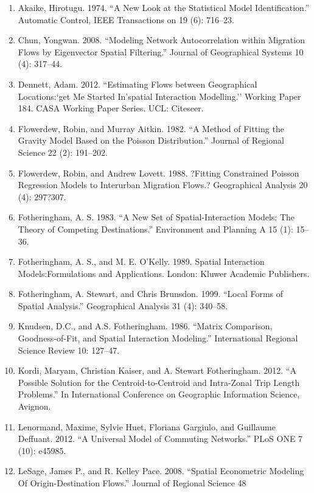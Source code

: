 \documentclass[11pt]{article}
\begin{document}
    \begin{enumerate}
\def\labelenumi{\arabic{enumi}.}
\item
  Akaike, Hirotugu. 1974. ``A New Look at the Statistical Model
  Identification.'' Automatic Control, IEEE Transactions on 19 (6):
  716--23.
\item
  Chun, Yongwan. 2008. ``Modeling Network Autocorrelation within
  Migration Flows by Eigenvector Spatial Filtering.'' Journal of
  Geographical Systems 10 (4): 317--44.
\item
  Dennett, Adam. 2012. ``Estimating Flows between Geographical
  Locations:`get Me Started In'spatial Interaction Modelling.'' Working
  Paper 184. CASA Working Paper Series. UCL: Citeseer.
\item
  Flowerdew, Robin, and Murray Aitkin. 1982. ``A Method of Fitting the
  Gravity Model Based on the Poisson Distribution.'' Journal of Regional
  Science 22 (2): 191--202.
\item
Flowerdew, Robin, and Andrew Lovett. 1988. ?Fitting Constrained Poisson Regression Models to Interurban Migration Flows.? Geographical Analysis 20 (4): 297?307. 
\item
  Fotheringham, A. S. 1983. ``A New Set of Spatial-Interaction Models:
  The Theory of Competing Destinations.'' Environment and Planning A 15
  (1): 15--36.
\item
  Fotheringham, A. S., and M. E. O'Kelly. 1989. Spatial Interaction
  Models:Formulations and Applications. London: Kluwer Academic
  Publishers.
\item
  Fotheringham, A. Stewart, and Chris Brunsdon. 1999. ``Local Forms of
  Spatial Analysis.'' Geographical Analysis 31 (4): 340--58.
\item
  Knudsen, D.C., and A.S. Fotheringham. 1986. ``Matrix Comparison,
  Goodness-of-Fit, and Spatial Interaction Modeling.'' International
  Regional Science Review 10: 127--47.
\item
  Kordi, Maryam, Christian Kaiser, and A. Stewart Fotheringham. 2012.
  ``A Possible Solution for the Centroid-to-Centroid and Intra-Zonal
  Trip Length Problems.'' In International Conference on Geographic
  Information Science, Avignon.
\item
  Lenormand, Maxime, Sylvie Huet, Floriana Gargiulo, and Guillaume
  Deffuant. 2012. ``A Universal Model of Commuting Networks.'' PLoS ONE
  7 (10): e45985.
\item
  LeSage, James P., and R. Kelley Pace. 2008. ``Spatial Econometric
  Modeling Of Origin-Destination Flows.'' Journal of Regional Science 48

\end{enumerate}
\end{document}
